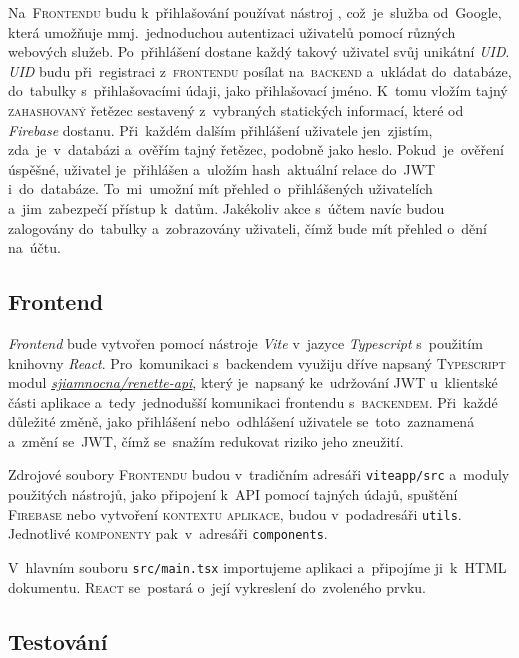 \documentclass[14pt,a4paper]{article}
\begin{document}
            Na~\textsc{Frontendu} budu k~přihlašování používat nástroj \href{Google Firebase}, což~je~služba od~Google, která umožňuje mmj.~jednoduchou autentizaci uživatelů pomocí různých webových služeb. Po~přihlášení dostane každý takový uživatel svůj unikátní \emph{UID}. \emph{UID} budu při~registraci z~\textsc{frontendu} posílat na~\textsc{backend} a~ukládat do~databáze, do~tabulky s~přihlašovacími údaji, jako přihlašovací jméno. K~tomu vložím tajný \textsc{zahashovaný} řetězec sestavený z~vybraných statických informací, které od \emph{Firebase} dostanu. Při~každém dalším přihlášení uživatele jen~zjistím, zda~je~v~databázi a~ověřím tajný řetězec, podobně jako heslo. Pokud~je~ověření úspěšné, uživatel je~přihlášen a~uložím hash~aktuální relace do~\textsc{JWT} i~do~databáze. To~mi~umožní mít přehled o~přihlášených uživatelích a~jim~zabezpečí přístup k~datům. Jakékoliv akce s~účtem navíc budou zalogovány do~tabulky a~zobrazovány uživateli, čímž bude mít přehled o~dění na~účtu.

        \subsection{Frontend}
            \emph{Frontend} bude vytvořen pomocí nástroje \emph{Vite} v~jazyce \emph{Typescript} s~použitím knihovny \emph{React}. Pro~komunikaci s~backendem využiju dříve napsaný \textsc{Typescript} modul \href{https://gitlab.com/sjiamnocna/renette-api}{\emph{sjiamnocna/renette-api}}, který je~napsaný ke~udržování \textsc{JWT} u~klientské části aplikace a~tedy~jednodušší komunikaci frontendu s~\textsc{backendem}. Při~každé důležité změně, jako přihlášení nebo~odhlášení uživatele se~toto~zaznamená a~změní se~\textsc{JWT}, čímž se~snažím redukovat riziko jeho zneužití.

            Zdrojové soubory \textsc{Frontendu} budou v~tradičním adresáři \texttt{viteapp/src} a~moduly použitých nástrojů, jako připojení k~\textsc{API} pomocí tajných údajů, spuštění \textsc{Firebase} nebo vytvoření \textsc{kontextu aplikace}, budou v~podadresáři \texttt{utils}. Jednotlivé \textsc{komponenty} pak~v~adresáři \texttt{components}.

            V~hlavním souboru \texttt{src/main.tsx} importujeme aplikaci a~připojíme ji~k~\textsc{HTML} dokumentu. \textsc{React} se~postará o~její vykreslení do~zvoleného prvku.
        \subsection{Testování}
\end{document}
